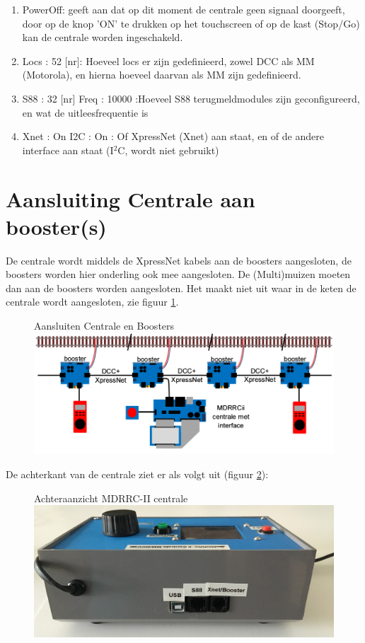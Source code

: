 \documentclass[12pt,a4paper]{report}
\newcommand*{\isqc}{I$^{2}$C}
\begin{document}
\begin{enumerate}
\item PowerOff: geeft aan dat op dit moment de centrale geen signaal doorgeeft, door op de knop 'ON' te drukken op het touchscreen of op de kast (Stop/Go) kan de centrale worden ingeschakeld.
\item Locs : 52 [nr]: Hoeveel locs er zijn gedefinieerd, zowel DCC als MM (Motorola), en hierna hoeveel daarvan als MM zijn gedefinieerd.
\item S88  : 32 [nr] Freq : 10000 :Hoeveel S88 terugmeldmodules zijn geconfigureerd, en wat de uitleesfrequentie is
\item Xnet : On  I2C : On : Of XpressNet (Xnet) aan staat, en of de andere interface aan staat (\isqc, wordt niet gebruikt)
\end{enumerate}

\section{Aansluiting Centrale aan booster(s)}
De centrale wordt middels de XpressNet kabels aan de boosters aangesloten, de boosters worden hier onderling ook mee aangesloten. De (Multi)muizen moeten dan aan de boosters worden aangesloten. Het maakt niet uit waar in de keten de centrale wordt aangesloten, zie figuur \ref{im:aansluiten_booster}.

\begin{figure}[ht]
  \captionbox
  {Aansluiten Centrale en Boosters\label{im:aansluiten_booster}}
  {\includegraphics[scale=0.5]{images/rcu_schema1}\\}
\end{figure}

De achterkant van de centrale ziet er als volgt uit (figuur \ref{centrale_achter}):\\

\begin{figure}[h]
  \captionbox
  {Achteraanzicht MDRRC-II centrale\label{centrale_achter}}
  {\includegraphics[scale=0.3]{images/rcu_foto5}\\}
\end{figure}
\end{document}
